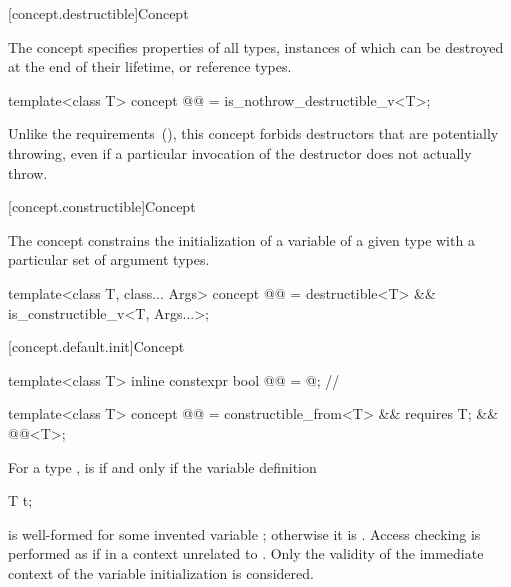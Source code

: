 [concept.destructible]{Concept }

\pnum
The  concept specifies properties of all types,
instances of which can be destroyed at the end of their lifetime, or reference
types.

\begin{itemdecl}
template<class T>
  concept @@ = is_nothrow_destructible_v<T>;
\end{itemdecl}

\begin{itemdescr}
\pnum
\begin{note}
Unlike the  requirements~(), this
concept forbids destructors that are potentially throwing, even if a particular
invocation of the destructor does not actually throw.
\end{note}
\end{itemdescr}

[concept.constructible]{Concept }

\pnum
The  concept constrains the initialization of a
variable of a given type with a particular set of argument types.

\begin{itemdecl}
template<class T, class... Args>
  concept @@ = destructible<T> && is_constructible_v<T, Args...>;
\end{itemdecl}

[concept.default.init]{Concept }

\begin{itemdecl}
template<class T>
  inline constexpr bool @@ = @\seebelow@;  // \expos

template<class T>
  concept @@ = constructible_from<T> &&
                                  requires { T{}; } &&
                                  @@<T>;
\end{itemdecl}

\begin{itemdescr}
\pnum
For a type ,  is 
if and only if the variable definition
\begin{codeblock}
T t;
\end{codeblock}
is well-formed for some invented variable ;
otherwise it is .
Access checking is performed as if in a context unrelated to .
Only the validity of the immediate context of the variable initialization is considered.
\end{itemdescr}


